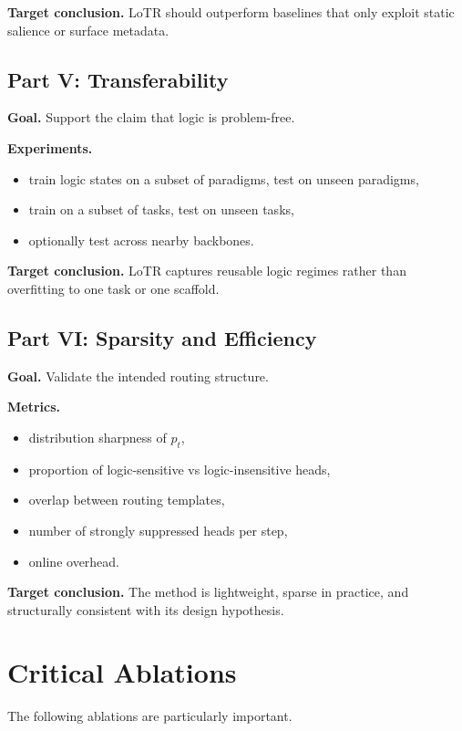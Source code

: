 \documentclass[11pt]{article}
\begin{document}
\textbf{Target conclusion.}
LoTR should outperform baselines that only exploit static salience or surface metadata.

\subsection{Part V: Transferability}

\textbf{Goal.} Support the claim that logic is problem-free.

\textbf{Experiments.}
\begin{itemize}[leftmargin=1.5em]
    \item train logic states on a subset of paradigms, test on unseen paradigms,
    \item train on a subset of tasks, test on unseen tasks,
    \item optionally test across nearby backbones.
\end{itemize}

\textbf{Target conclusion.}
LoTR captures reusable logic regimes rather than overfitting to one task or one scaffold.

\subsection{Part VI: Sparsity and Efficiency}

\textbf{Goal.} Validate the intended routing structure.

\textbf{Metrics.}
\begin{itemize}[leftmargin=1.5em]
    \item distribution sharpness of $p_t$,
    \item proportion of logic-sensitive vs logic-insensitive heads,
    \item overlap between routing templates,
    \item number of strongly suppressed heads per step,
    \item online overhead.
\end{itemize}

\textbf{Target conclusion.}
The method is lightweight, sparse in practice, and structurally consistent with its design hypothesis.

\section{Critical Ablations}

The following ablations are particularly important.
\end{document}
